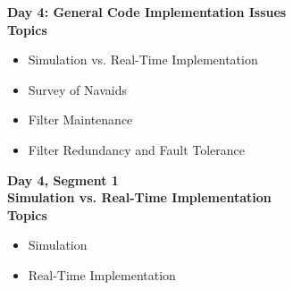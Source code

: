 \begin{frame}
\textbf{Day 4: General Code Implementation Issues\\
Topics}
 \begin{itemize}
 \item Simulation vs. Real-Time Implementation
 \item Survey of Navaids
 \item Filter Maintenance
 \item Filter Redundancy and Fault Tolerance
\end{itemize}
\end{frame}
\begin{frame}
\textbf{Day 4, Segment 1\\
Simulation vs. Real-Time Implementation\\
Topics }
\begin{itemize}
 \item Simulation
 \item Real-Time Implementation
\end{itemize}
\end{frame}



